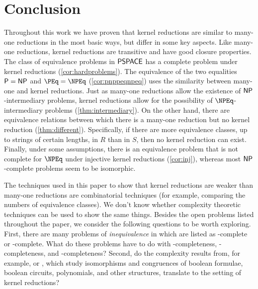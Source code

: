 \section{Conclusion}
%
Throughout this work we have proven that kernel reductions are similar to many-one reductions in the most basic ways, but differ in some key aspects.
Like many-one reductions, kernel reductions are transitive and have good closure properties.
The class of equivalence problems in ${\mathsf{PSPACE}}$ has a complete problem under kernel reductions (\autoref{cor:hardproblems}).
The equivalence of the two equalities ${\mathsf{P}} = {\mathsf{NP}}$ and $\PEq = \NPEq$ (\autoref{cor:pnppeqnpeq}) uses the similarity between many-one and kernel reductions.
Just as many-one reductions allow the existence of ${\mathsf{NP}}$-intermediary problems, kernel reductions allow for the possibility of $\NPEq$-intermediary problems (\autoref{thm:intermediary}).
On the other hand, there are equivalence relations between which there is a many-one reduction but no kernel reduction (\autoref{thm:different}).
Specifically, if there are more equivalence classes, up to strings of certain lengths, in $R$ than in $S$, then no kernel reduction can exist.
Finally, under some assumptions, there is an equivalence problem that is not complete for $\NPEq$ under injective kernel reductions (\autoref{cor:inj}), whereas most ${\mathsf{NP}}$-complete problems seem to be isomorphic.

The techniques used in this paper to show that kernel reductions are weaker than many-one reductions are combinatorial techniques (for example, comparing the numbers of equivalence classes).
We don't know whether complexity theoretic techniques can be used to show the same things.
Besides the open problems listed throughout the paper, we consider the following questions to be worth exploring.
First, there are many problems of \emph{inequivalence} in \autocite{gj79} which are listed as \NP-complete or \PSPACE-complete.
What do these problems have to do with \NPEq-completeness, \coNPEq-completeness, and \PSPACEEq-completeness?
Second, do the complexity results from, for example, \autocite{at96} or \autocite{rs11}, which study isomorphisms and congruences of boolean formulae, boolean circuits, polynomials, and other structures, translate to the setting of kernel reductions?
